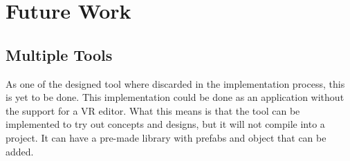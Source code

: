 \chapter{Future Work}
\section{Multiple Tools}
As one of the designed tool where discarded in the implementation process, this is yet to be done. This implementation could be done as an application without the support for a VR editor. What this means is that the tool can be implemented to try out concepts and designs, but it will not compile into a project. It can have a pre-made library with prefabs and object that can be added.
